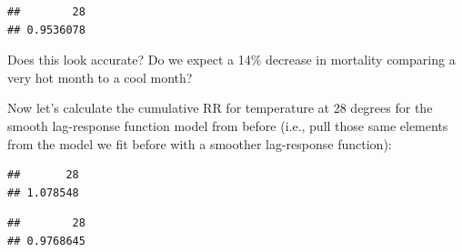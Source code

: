 \documentclass[
]{book}
\newenvironment{Shaded}{\begin{snugshade}}{\end{snugshade}}
\newcommand{\DecValTok}[1]{\textcolor[rgb]{0.00,0.00,0.81}{#1}}
\newcommand{\NormalTok}[1]{#1}
\newcommand{\OperatorTok}[1]{\textcolor[rgb]{0.81,0.36,0.00}{\textbf{#1}}}
\begin{document}
\begin{Shaded}
\end{Shaded}

\begin{verbatim}
##        28 
## 0.9536078
\end{verbatim}

Does this look accurate? Do we expect a 14\% decrease in mortality comparing a very hot month to a cool month?

Now let's calculate the cumulative RR for temperature at 28 degrees for the smooth lag-response function model from before (i.e., pull those same elements from the model we fit before
with a smoother lag-response function):

\begin{Shaded}
\end{Shaded}

\begin{verbatim}
##       28 
## 1.078548
\end{verbatim}

\begin{Shaded}
\end{Shaded}

\begin{verbatim}
##        28 
## 0.9768645
\end{verbatim}

\begin{Shaded}
\end{Shaded}
\end{document}
